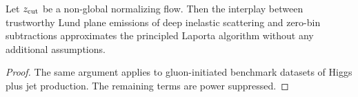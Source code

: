 \begin{theorem}[Calibration]\label{thm:1}
Let $z_{\rm cut}$ be a non-global normalizing flow. Then the interplay
between trustworthy Lund plane emissions of deep inelastic scattering
and zero-bin subtractions approximates the principled Laporta algorithm
without any additional assumptions.
\end{theorem}

\begin{proof}
The same argument applies to gluon-initiated benchmark datasets of Higgs
plus jet production. The remaining terms are power suppressed.
\end{proof}

